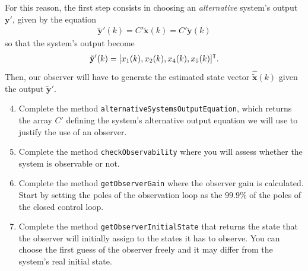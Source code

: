 	For this reason, the first step consists in choosing an \emph{alternative} system's output %
	$\mathbf{y}'$, %
	given by the equation
	\begin{align}
		\mathbf{\tilde{y}}'(k) = C' \mathbf{\tilde{x}}(k) = C'\mathbf{\tilde{y}}(k)
	\end{align}
	so that the system's output become 
	\begin{align}
		\mathbf{\tilde{y}}'(k) = {\left[x_1(k), x_2(k), x_4(k), x_5(k) \right]}^\intercal.
	\end{align}
	Then, our observer will have to generate the estimated state vector $\hat{\tilde{\mathbf{x}}}(k)$ given the output $\mathbf{\tilde{y}}'$.

	\begin{enumerate}
		\setcounter{enumi}{3}
		\item Complete the method \texttt{alternativeSystemsOutputEquation}, which returns the array %
		$C'$ %
		defining the system's alternative output equation we will use to justify the use of an observer. 
		
		\item Complete the method \texttt{checkObservability} where you will assess whether the system is observable or not. 
		

		\item Complete the method \texttt{getObserverGain} where the observer gain is calculated.
		Start by setting the poles of the observation loop as the %
		$99.9\%$ %
		of the poles of the closed control loop. 



		\item Complete the method \texttt{getObserverInitialState} that returns the state that the observer will initially assign to the states it has to observe. 
		You can choose the first guess of the observer freely and it may differ from the system's real initial state. 
	\end{enumerate} 

